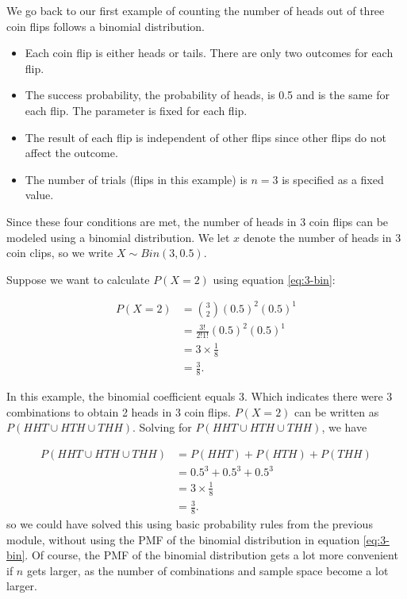 \documentclass[
]{book}
\providecommand{\tightlist}{%
  \setlength{\itemsep}{0pt}\setlength{\parskip}{0pt}}
\begin{document}
We go back to our first example of counting the number of heads out of three coin flips follows a binomial distribution.

\begin{itemize}
\tightlist
\item
  Each coin flip is either heads or tails. There are only two outcomes for each flip.
\item
  The success probability, the probability of heads, is 0.5 and is the same for each flip. The parameter is fixed for each flip.
\item
  The result of each flip is independent of other flips since other flips do not affect the outcome.
\item
  The number of trials (flips in this example) is \(n=3\) is specified as a fixed value.
\end{itemize}

Since these four conditions are met, the number of heads in 3 coin flips can be modeled using a binomial distribution. We let \(x\) denote the number of heads in 3 coin clips, so we write \(X \sim Bin(3,0.5)\).

Suppose we want to calculate \(P(X=2)\) using equation \eqref{eq:3-bin}:

\[
\begin{split}
P(X=2) &= \binom{3}{2} (0.5)^2 (0.5)^1\\
       &= \frac{3!}{2! 1!} (0.5)^2 (0.5)^1 \\
       &= 3 \times \frac{1}{8} \\
       &= \frac{3}{8}.
\end{split}
\]

In this example, the binomial coefficient equals 3. Which indicates there were 3 combinations to obtain 2 heads in 3 coin flips. \(P(X=2)\) can be written as \(P(HHT \cup HTH \cup THH)\). Solving for \(P(HHT \cup HTH \cup THH)\), we have

\[
\begin{split}
P(HHT \cup HTH \cup THH) &= P(HHT) + P(HTH) + P(THH)\\
       &= 0.5^3 + 0.5^3 + 0.5^3 \\
       &= 3 \times \frac{1}{8} \\
       &= \frac{3}{8}.
\end{split}
\]
so we could have solved this using basic probability rules from the previous module, without using the PMF of the binomial distribution in equation \eqref{eq:3-bin}. Of course, the PMF of the binomial distribution gets a lot more convenient if \(n\) gets larger, as the number of combinations and sample space become a lot larger.
\end{document}
